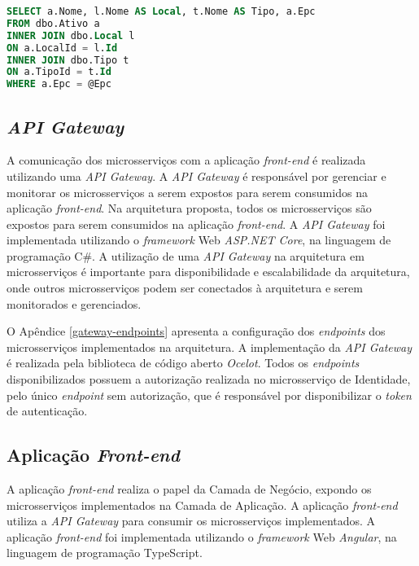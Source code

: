 \begin{lstlisting}[language=SQL, caption={Consulta SQL no microsserviço de Ativo.}, label=sql-ativo]
SELECT a.Nome, l.Nome AS Local, t.Nome AS Tipo, a.Epc
FROM dbo.Ativo a
INNER JOIN dbo.Local l
ON a.LocalId = l.Id
INNER JOIN dbo.Tipo t
ON a.TipoId = t.Id
WHERE a.Epc = @Epc
\end{lstlisting}

\subsection{\textit{API Gateway}}

A comunicação dos microsserviços com a aplicação \textit{front-end} é realizada utilizando uma \textit{API Gateway}. A \textit{API Gateway} é responsável por gerenciar e monitorar os microsserviços a serem expostos para serem consumidos na aplicação \textit{front-end}. Na arquitetura proposta, todos os microsserviços são expostos para serem consumidos na aplicação \textit{front-end}. A \textit{API Gateway} foi implementada utilizando o \textit{framework} Web \textit{ASP.NET Core}, na linguagem de programação C\#. A utilização de uma \textit{API Gateway} na arquitetura em microsserviços é importante para disponibilidade e escalabilidade da arquitetura, onde outros microsserviços podem ser conectados à arquitetura e serem monitorados e gerenciados.

O Apêndice \ref{gateway-endpoints} apresenta a configuração dos \textit{endpoints} dos microsserviços implementados na arquitetura. A implementação da \textit{API Gateway} é realizada pela biblioteca de código aberto \textit{Ocelot}. Todos os \textit{endpoints} disponibilizados possuem a autorização realizada no microsserviço de Identidade, pelo único \textit{endpoint} sem autorização, que é responsável por disponibilizar o \textit{token} de autenticação.

\subsection{Aplicação \textit{Front-end}}

A aplicação \textit{front-end} realiza o papel da Camada de Negócio, expondo os microsserviços implementados na Camada de Aplicação. A aplicação \textit{front-end} utiliza a \textit{API Gateway} para consumir os microsserviços implementados. A aplicação \textit{front-end} foi implementada utilizando o \textit{framework} Web \textit{Angular}, na linguagem de programação TypeScript.

